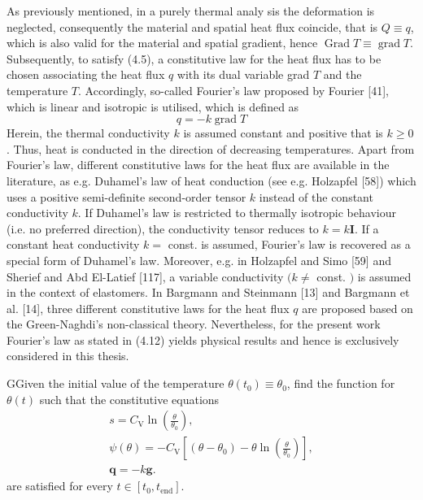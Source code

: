 As previously mentioned, in a purely thermal analy sis the deformation is neglected, consequently the material and spatial heat flux coincide, that is \(Q \equiv q\), which is also valid for the material and spatial gradient, hence \(\operatorname{Grad} T \equiv \operatorname{grad} T\). Subsequently, to satisfy (4.5), a constitutive law for the heat flux has to be chosen associating the heat flux \(q\) with its dual variable grad \(T\) and the temperature \(T\). Accordingly, so-called Fourier's law proposed by Fourier [41], which is linear and isotropic is utilised, which is defined as
\[
q=-k \operatorname{grad} T
\]
Herein, the thermal conductivity \(k\) is assumed constant and positive that is \(k \geq 0\). Thus, heat is conducted in the direction of decreasing temperatures. Apart from Fourier's law, different constitutive laws for the heat flux are available in the literature, as e.g. Duhamel's law of heat conduction (see e.g. Holzapfel [58]) which uses a positive semi-definite second-order tensor \(k\) instead of the constant conductivity \(k\). If Duhamel's law is restricted to thermally isotropic behaviour (i.e. no preferred direction), the conductivity tensor reduces to \(k=k \boldsymbol{I}\). If a constant heat conductivity \(k=\) const. is assumed, Fourier's law is recovered as a special form of Duhamel's law. Moreover, e.g. in Holzapfel and Simo [59] and Sherief and Abd El-Latief [117], a variable conductivity \((k \neq\) const. \()\) is assumed in the context of elastomers. In Bargmann and Steinmann [13] and Bargmann et al. [14], three different constitutive laws for the heat flux \(q\) are proposed based on the Green-Naghdi's non-classical theory. Nevertheless, for the present work Fourier's law as stated in (4.12) yields physical results and hence is exclusively considered in this thesis.

\begin{problem}
GGiven the initial value of the temperature \(\theta(t_0)\equiv \theta_0\), find the function for $\theta(t)$ such that the constitutive equations
\begin{gather}
    s =C_{\mathrm{V}} \ln \left(\frac{\theta}{\theta_{0}}\right),\\
    \psi(\theta) = - C_{\mathrm{V}}\left[\left(\theta-\theta_{0}\right)-\theta \ln \left(\frac{\theta}{\theta_{0}}\right)\right],\\
    \bm q = -k\bm g.
\end{gather}
are satisfied for every $t\in [t_0, t_\text{end}]$.
\end{problem}

